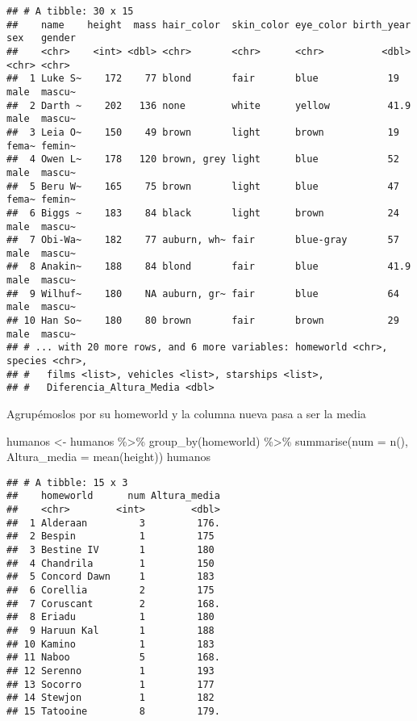 \documentclass[
]{book}
\newenvironment{Shaded}{\begin{snugshade}}{\end{snugshade}}
\newcommand{\AttributeTok}[1]{\textcolor[rgb]{0.77,0.63,0.00}{#1}}
\newcommand{\FunctionTok}[1]{\textcolor[rgb]{0.00,0.00,0.00}{#1}}
\newcommand{\NormalTok}[1]{#1}
\newcommand{\OtherTok}[1]{\textcolor[rgb]{0.56,0.35,0.01}{#1}}
\newcommand{\SpecialCharTok}[1]{\textcolor[rgb]{0.00,0.00,0.00}{#1}}
\begin{document}
\begin{verbatim}
## # A tibble: 30 x 15
##    name    height  mass hair_color  skin_color eye_color birth_year sex   gender
##    <chr>    <int> <dbl> <chr>       <chr>      <chr>          <dbl> <chr> <chr> 
##  1 Luke S~    172    77 blond       fair       blue            19   male  mascu~
##  2 Darth ~    202   136 none        white      yellow          41.9 male  mascu~
##  3 Leia O~    150    49 brown       light      brown           19   fema~ femin~
##  4 Owen L~    178   120 brown, grey light      blue            52   male  mascu~
##  5 Beru W~    165    75 brown       light      blue            47   fema~ femin~
##  6 Biggs ~    183    84 black       light      brown           24   male  mascu~
##  7 Obi-Wa~    182    77 auburn, wh~ fair       blue-gray       57   male  mascu~
##  8 Anakin~    188    84 blond       fair       blue            41.9 male  mascu~
##  9 Wilhuf~    180    NA auburn, gr~ fair       blue            64   male  mascu~
## 10 Han So~    180    80 brown       fair       brown           29   male  mascu~
## # ... with 20 more rows, and 6 more variables: homeworld <chr>, species <chr>,
## #   films <list>, vehicles <list>, starships <list>,
## #   Diferencia_Altura_Media <dbl>
\end{verbatim}

Agrupémoslos por su homeworld y la columna nueva pasa a ser la media

\begin{Shaded}
\begin{Highlighting}[]
\NormalTok{humanos }\OtherTok{\textless{}{-}}\NormalTok{ humanos }\SpecialCharTok{\%\textgreater{}\%} \FunctionTok{group\_by}\NormalTok{(homeworld) }\SpecialCharTok{\%\textgreater{}\%} \FunctionTok{summarise}\NormalTok{(}\AttributeTok{num =} \FunctionTok{n}\NormalTok{(), }
                                              \AttributeTok{Altura\_media =} \FunctionTok{mean}\NormalTok{(height))}
\NormalTok{humanos}
\end{Highlighting}
\end{Shaded}

\begin{verbatim}
## # A tibble: 15 x 3
##    homeworld      num Altura_media
##    <chr>        <int>        <dbl>
##  1 Alderaan         3         176.
##  2 Bespin           1         175 
##  3 Bestine IV       1         180 
##  4 Chandrila        1         150 
##  5 Concord Dawn     1         183 
##  6 Corellia         2         175 
##  7 Coruscant        2         168.
##  8 Eriadu           1         180 
##  9 Haruun Kal       1         188 
## 10 Kamino           1         183 
## 11 Naboo            5         168.
## 12 Serenno          1         193 
## 13 Socorro          1         177 
## 14 Stewjon          1         182 
## 15 Tatooine         8         179.
\end{verbatim}
\end{document}
